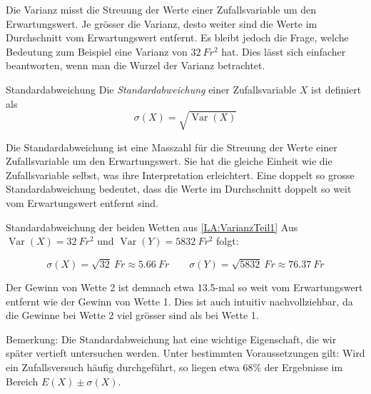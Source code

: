 Die Varianz misst die Streuung der Werte einer Zufallsvariable um den Erwartungswert. Je grösser die Varianz, desto weiter sind die Werte im Durchschnitt vom Erwartungswert entfernt. Es bleibt jedoch die Frage, welche Bedeutung zum Beispiel eine Varianz von \(32 \ Fr^2\) hat. Dies lässt sich einfacher beantworten, wenn man die Wurzel der Varianz betrachtet.

\begin{definition}
    {Standardabweichung}{}
    Die \textit{Standardabweichung} einer Zufallsvariable \(X\) ist definiert als
    \[\sigma(X) = \sqrt{\operatorname{Var}(X)}\]
\end{definition}

Die Standardabweichung ist eine Masszahl für die Streuung der Werte einer Zufallsvariable um den Erwartungswert. Sie hat die gleiche Einheit wie die Zufallsvariable selbst, was ihre Interpretation erleichtert. Eine doppelt so grosse Standardabweichung bedeutet, dass die Werte im Durchschnitt doppelt so weit vom Erwartungswert entfernt sind.

\begin{bsp}
    {Standardabweichung der beiden Wetten aus \cref{LA:VarianzTeil1}}{}
    Aus \(\operatorname{Var}(X) = 32 \ Fr^2\) und \(\operatorname{Var}(Y) = 5832 \ Fr^2\) folgt:

    \[\sigma(X) = \sqrt{32} \ Fr \approx 5.66 \ Fr \qquad \sigma(Y) = \sqrt{5832} \ Fr \approx 76.37 \ Fr\]

    Der Gewinn von Wette 2 ist demnach etwa 13.5-mal so weit vom Erwartungswert entfernt wie der Gewinn von Wette 1. Dies ist auch intuitiv nachvollziehbar, da die Gewinne bei Wette 2 viel grösser sind als bei Wette 1.
\end{bsp}

Bemerkung: Die Standardabweichung hat eine wichtige Eigenschaft, die wir später vertieft untersuchen werden. Unter bestimmten Voraussetzungen gilt: Wird ein Zufallsversuch häufig durchgeführt, so liegen etwa 68\% der Ergebnisse im Bereich \(E(X) \pm \sigma(X)\).


